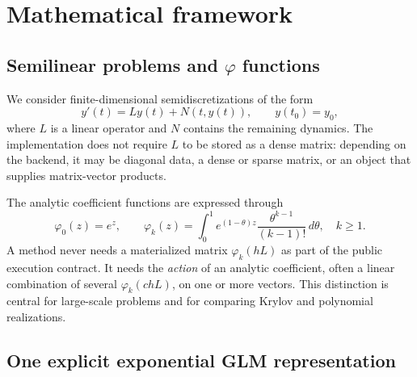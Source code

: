 \section{Mathematical framework}\label{sec:math}

\subsection{Semilinear problems and \texorpdfstring{$\varphi$}{phi} functions}

We consider finite-dimensional semidiscretizations of the form
\begin{equation}
  y'(t)=Ly(t)+N(t,y(t)),\qquad y(t_0)=y_0,
  \label{eq:semilinear}
\end{equation}
where $L$ is a linear operator and $N$ contains the remaining dynamics.  The
implementation does not require $L$ to be stored as a dense matrix: depending
on the backend, it may be diagonal data, a dense or sparse matrix, or an object
that supplies matrix-vector products.

The analytic coefficient functions are expressed through
\begin{equation}
 \varphi_0(z)=e^z,
 \qquad
 \varphi_k(z)=\int_0^1 e^{(1-\theta)z}
               \frac{\theta^{k-1}}{(k-1)!}\,d\theta,
 \quad k\ge1.
 \label{eq:phi}
\end{equation}
A method never needs a materialized matrix $\varphi_k(hL)$ as part of the
public execution contract.  It needs the \emph{action} of an analytic
coefficient, often a linear combination of several $\varphi_k(c hL)$, on one
or more vectors.  This distinction is central for large-scale problems and
for comparing Krylov and polynomial realizations.

\subsection{One explicit exponential GLM representation}

